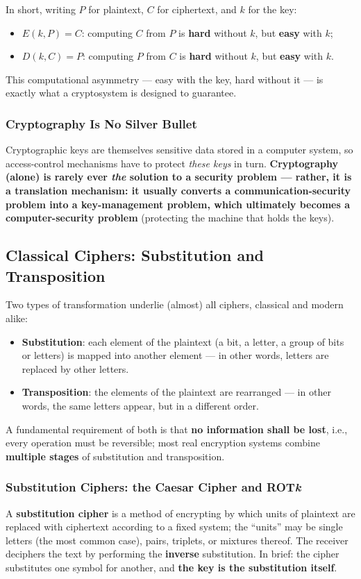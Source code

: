 \documentclass[12pt, a4paper]{article}
\begin{document}
In short, writing $P$ for plaintext, $C$ for ciphertext, and $k$ for the key:
\begin{itemize}
    \item $E(k,P) = C$: computing $C$ from $P$ is \textbf{hard} without $k$, but \textbf{easy} with $k$;
    \item $D(k,C) = P$: computing $P$ from $C$ is \textbf{hard} without $k$, but \textbf{easy} with $k$.
\end{itemize}
This computational asymmetry — easy with the key, hard without it — is exactly what a cryptosystem is designed to guarantee.

\subsubsection{Cryptography Is No Silver Bullet}
Cryptographic keys are themselves sensitive data stored in a computer system, so access-control mechanisms have to protect \emph{these keys} in turn. \textcolor{blue!50!black}{\textbf{Cryptography (alone) is rarely ever \emph{the} solution to a security problem — rather, it is a translation mechanism: it usually converts a communication-security problem into a key-management problem, which ultimately becomes a computer-security problem} (protecting the machine that holds the keys).}

\subsection{Classical Ciphers: Substitution and Transposition}

Two types of transformation underlie (almost) all ciphers, classical and modern alike:
\begin{itemize}
    \item \textbf{Substitution}: each element of the plaintext (a bit, a letter, a group of bits or letters) is mapped into another element — in other words, letters are replaced by other letters.
    \item \textbf{Transposition}: the elements of the plaintext are rearranged — in other words, the same letters appear, but in a different order.
\end{itemize}
A fundamental requirement of both is that \textbf{no information shall be lost}, i.e., every operation must be reversible; most real encryption systems combine \textbf{multiple stages} of substitution and transposition.

\subsubsection{Substitution Ciphers: the Caesar Cipher and ROT\textit{k}}
A \textbf{substitution cipher} is a method of encrypting by which units of plaintext are replaced with ciphertext according to a fixed system; the ``units'' may be single letters (the most common case), pairs, triplets, or mixtures thereof. The receiver deciphers the text by performing the \textbf{inverse} substitution. In brief: the cipher substitutes one symbol for another, and \textbf{the key is the substitution itself}.
\end{document}
